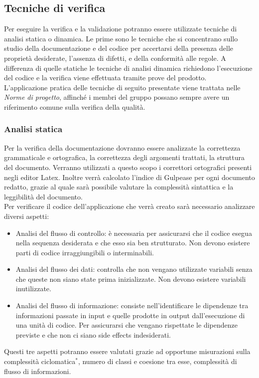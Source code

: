 \subsection{Tecniche di verifica}
Per eseguire la verifica e la validazione potranno essere utilizzate tecniche di analisi statica o dinamica. Le prime sono le tecniche che si concentrano sullo studio della documentazione e del codice per accertarsi della presenza delle proprietà desiderate, l'assenza di difetti, e della conformità alle regole. A differenza di quelle statiche le tecniche di analisi dinamica richiedono l'esecuzione del codice e la verifica viene effettuata tramite prove del prodotto.\\
L'applicazione pratica delle tecniche di seguito presentate viene trattata nelle \textit{Norme di progetto}, affinché i membri del gruppo possano sempre avere un riferimento comune sulla verifica della qualità.
\subsubsection{Analisi statica}
Per la verifica della documentazione dovranno essere analizzate la correttezza grammaticale e ortografica, la correttezza degli argomenti trattati, la struttura del documento. Verranno utilizzati a questo scopo i correttori ortografici presenti negli editor Latex. Inoltre verrà calcolato l'indice di Gulpease per ogni documento redatto, grazie al quale sarà possibile valutare la complessità sintattica e la leggibilità del documento.\\
Per verificare il codice dell'applicazione che verrà creato sarà necessario analizzare diversi aspetti:
\begin{itemize}
\item Analisi del flusso di controllo: è necessaria per assicurarsi che il codice esegua nella sequenza desiderata e che esso sia ben strutturato. Non devono esistere parti di codice irraggiungibili o interminabili.
\item Analisi del flusso dei dati: controlla che non vengano utilizzate variabili senza che queste non siano state prima inizializzate. Non devono esistere variabili inutilizzate. 
\item Analisi del flusso di informazione: consiste nell'identificare le dipendenze tra informazioni passate in input e quelle prodotte in output dall’esecuzione di una unità di codice. Per assicurarsi che vengano rispettate le dipendenze previste e che non ci siano side effects indesiderati.
\end{itemize}
Questi tre aspetti potranno essere valutati grazie ad opportune misurazioni sulla complessità ciclomatica$^*$, numero di classi e coesione tra esse, complessità di flusso di informazioni.
\newpage
